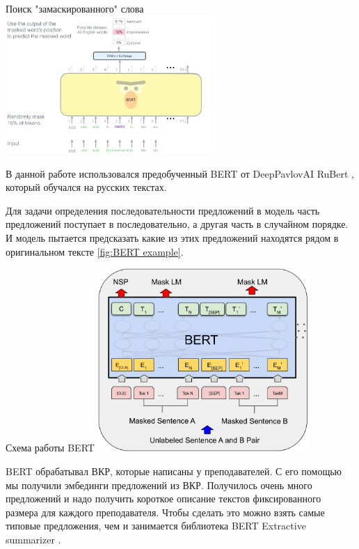\documentclass[PI,KR]{HSEUniversity}
\begin{document}
\begin{FIGURE}[h]{Поиск "замаскированного" слова \label{fig:BERT illustrated}}
	\includegraphics[width=0.6\textwidth]{img/BERT illustrated}
\end{FIGURE}

В данной работе использовался предобученный BERT от DeepPavlovAI RuBert \cite{kuratov2019adaptation}, который обучался на русских текстах. 

Для задачи определения последовательности предложений в модель часть предложений поступает в последовательно, а другая часть в случайном порядке. И модель пытается предсказать какие из этих предложений находятся рядом в оригинальном тексте \ref{fig:BERT example}.

\begin{FIGURE}[h]{Схема работы BERT \label{fig:BERT example}}
	\includegraphics[width=0.6\textwidth]{img/BERT example}
\end{FIGURE}

BERT обрабатывал ВКР, которые написаны у преподавателей. С его помощью мы получили эмбединги предложений из ВКР. Получилось очень много предложений и надо получить короткое описание текстов фиксированного размера для каждого преподавателя. Чтобы сделать это можно взять самые типовые предложения, чем и занимается библиотека BERT Extractive summarizer \cite{miller2019leveraging}. 
\end{document}
